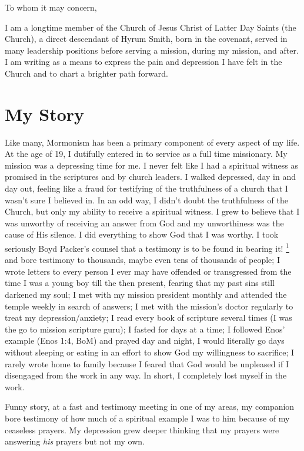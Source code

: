 \documentclass[a4paper]{article}
\providecommand*{\DUfootnotemark}[3]{%
  \raisebox{1em}{\hypertarget{#1}{}}%
  \hyperlink{#2}{\textsuperscript{#3}}%
}
\begin{document}
To whom it may concern,

I am a longtime member of the Church of Jesus Christ of Latter Day Saints (the Church), a direct descendant of Hyrum Smith, born in the covenant, served in many leadership positions before serving a mission, during my mission, and after.  I am writing as a means to express the pain and depression I have felt in the Church and to chart a brighter path forward.


\section{My Story%
  \label{my-story}%
}

Like many, Mormonism has been a primary component of every aspect of my life.  At the age of 19, I dutifully entered in to service as a full time missionary.  My mission was a depressing time for me.  I never felt like I had a spiritual witness as promised in the scriptures and by church leaders.  I walked depressed, day in and day out, feeling like a fraud for testifying of the truthfulness of a church that I wasn't sure I believed in.  In an odd way, I didn't doubt the truthfulness of the Church, but only my ability to receive a spiritual witness.  I grew to believe that I was unworthy of receiving an answer from God and my unworthiness was the cause of His silence.  I did everything to show God that I was worthy.  I took seriously Boyd Packer's counsel that \textquotedbl{}a testimony is to be found in bearing it!\textquotedbl{}\DUfootnotemark{id1}{id12}{1} and bore testimony to thousands, maybe even tens of thousands of people; I wrote letters to every person I ever may have offended or transgressed from the time I was a young boy till the then present, fearing that my past sins still darkened my soul; I met with my mission president monthly and attended the temple weekly in search of answers;  I met with the mission's doctor regularly to treat my depression/anxiety; I read every book of scripture several times (I was the go to mission \textquotedbl{}scripture guru\textquotedbl{}); I fasted for days at a time; I followed Enos' example (Enos 1:4, BoM) and prayed day and night, I would literally go days without sleeping or eating in an effort to show God my willingness to sacrifice; I rarely wrote home to family because I feared that God would be unpleased if I disengaged from the work in any way.  In short, I completely \textquotedbl{}lost myself in the work\textquotedbl{}.

Funny story, at a fast and testimony meeting in one of my areas, my companion bore testimony of how much of a spiritual example I was to him because of my ceaseless prayers.  My depression grew deeper thinking that my prayers were answering \emph{his} prayers but not my own.
\end{document}
